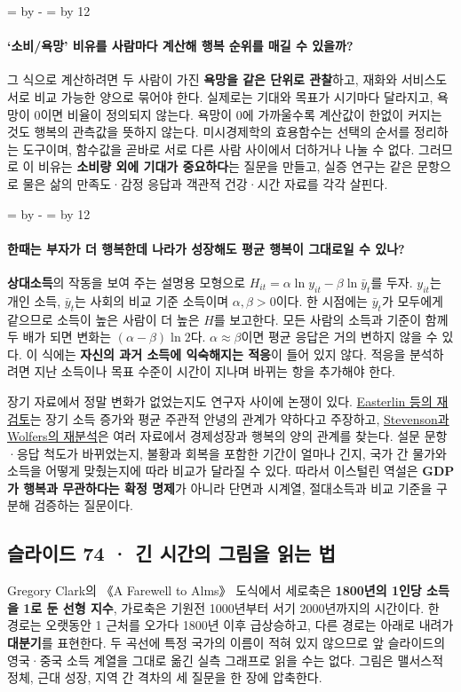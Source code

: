 \documentclass[10pt,a4paper]{article}
\newcommand{\ReserveQuestionSpace}{%
  \par\begingroup
  \dimen0=\pagegoal \advance\dimen0 by -\pagetotal
  \dimen2=\baselineskip \multiply\dimen2 by 12
  \ifdim\dimen0<\dimen2 \newpage\fi
  \endgroup}
\begin{document}
\ReserveQuestionSpace
\paragraph{‘소비/욕망’ 비유를 사람마다 계산해 행복 순위를 매길 수 있을까?}

그 식으로 계산하려면 두 사람이 가진 \textbf{욕망을 같은 단위로 관찰}하고, 재화와 서비스도 서로 비교 가능한 양으로 묶어야 한다. 실제로는 기대와 목표가 시기마다 달라지고, 욕망이 0이면 비율이 정의되지 않는다. 욕망이 0에 가까울수록 계산값이 한없이 커지는 것도 행복의 관측값을 뜻하지 않는다. 미시경제학의 효용함수는 선택의 순서를 정리하는 도구이며, 함수값을 곧바로 서로 다른 사람 사이에서 더하거나 나눌 수 없다. 그러므로 이 비유는 \textbf{소비량 외에 기대가 중요하다}는 질문을 만들고, 실증 연구는 같은 문항으로 물은 삶의 만족도·감정 응답과 객관적 건강·시간 자료를 각각 살핀다.\par

\ReserveQuestionSpace
\paragraph{한때는 부자가 더 행복한데 나라가 성장해도 평균 행복이 그대로일 수 있나?}
\textbf{상대소득}의 작동을 보여 주는 설명용 모형으로 $H_{it}=\alpha\ln y_{it}-\beta\ln\bar y_t$를 두자. $y_{it}$는 개인 소득, $\bar y_t$는 사회의 비교 기준 소득이며 $\alpha,\beta>0$이다. 한 시점에는 $\bar y_t$가 모두에게 같으므로 소득이 높은 사람이 더 높은 $H$를 보고한다. 모든 사람의 소득과 기준이 함께 두 배가 되면 변화는 $(\alpha-\beta)\ln2$다. $\alpha\approx\beta$이면 평균 응답은 거의 변하지 않을 수 있다. 이 식에는 \textbf{자신의 과거 소득에 익숙해지는 적응}이 들어 있지 않다. 적응을 분석하려면 지난 소득이나 목표 수준이 시간이 지나며 바뀌는 항을 추가해야 한다.\par

장기 자료에서 정말 변화가 없었는지도 연구자 사이에 논쟁이 있다. \href{https://pmc.ncbi.nlm.nih.gov/articles/PMC3012515/}{Easterlin 등의 재검토}는 장기 소득 증가와 평균 주관적 안녕의 관계가 약하다고 주장하고, \href{https://www.nber.org/papers/w14282}{Stevenson과 Wolfers의 재분석}은 여러 자료에서 경제성장과 행복의 양의 관계를 찾는다. 설문 문항·응답 척도가 바뀌었는지, 불황과 회복을 포함한 기간이 얼마나 긴지, 국가 간 물가와 소득을 어떻게 맞췄는지에 따라 비교가 달라질 수 있다. 따라서 이스털린 역설은 \textbf{GDP가 행복과 무관하다는 확정 명제}가 아니라 단면과 시계열, 절대소득과 비교 기준을 구분해 검증하는 질문이다.\par

\subsection{슬라이드 74 · 긴 시간의 그림을 읽는 법}
Gregory Clark의 《A Farewell to Alms》 도식에서 세로축은 \textbf{1800년의 1인당 소득을 1로 둔 선형 지수}, 가로축은 기원전 1000년부터 서기 2000년까지의 시간이다. 한 경로는 오랫동안 1 근처를 오가다 1800년 이후 급상승하고, 다른 경로는 아래로 내려가 \textbf{대분기}를 표현한다. 두 곡선에 특정 국가의 이름이 적혀 있지 않으므로 앞 슬라이드의 영국·중국 소득 계열을 그대로 옮긴 실측 그래프로 읽을 수는 없다. 그림은 맬서스적 정체, 근대 성장, 지역 간 격차의 세 질문을 한 장에 압축한다.\par
\end{document}
